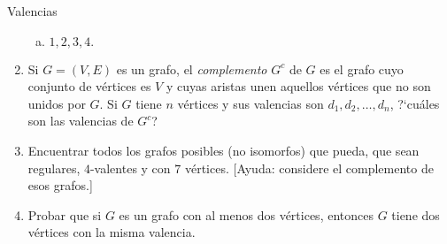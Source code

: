 \begin{section}{Valencias}
\begin{enumerate}[1)]
\begin{multicols}{2}
\begin{enumerate}[a)]
		\item $1,2,3,4.$
	\end{enumerate}
\end{multicols}
%
%
%
\item Si $G=(V,E)$ es un grafo, el {\em complemento} $G^c$ de $G$ es el grafo cuyo conjunto de
vértices es $V$ y cuyas aristas unen aquellos vértices que no son
unidos por $G$. Si $G$ tiene $n$ vértices y sus valencias son
$d_1,d_2,\ldots,d_n$, ?`cuáles son las valencias de $G^c$?
\item Encuentrar todos los grafos posibles (no isomorfos) que pueda, que sean regulares,
$4$-valentes y con $7$ vértices. [Ayuda: considere el complemento de esos grafos.]

\item Probar que si $G$ es un grafo con al menos dos vértices, entonces $G$ tiene dos
vértices con la misma valencia.
\end{enumerate}


\end{section}




